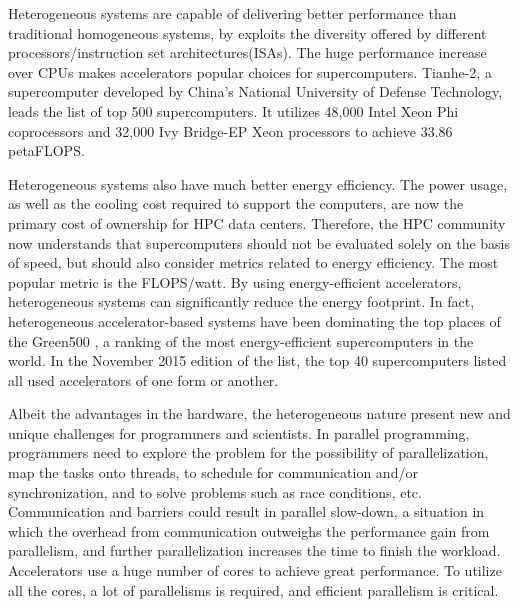 

Heterogeneous systems are capable of delivering better performance than 
traditional homogeneous systems, by exploits the diversity offered by different 
processors/instruction set architectures(ISAs). 
The huge performance increase over CPUs makes accelerators popular choices for
supercomputers. Tianhe-2\cite{Liao2014}, a supercomputer developed by China’s National 
University of Defense Technology, leads the list of top 500 supercomputers\cite{top500-2015-11}.
It utilizes 48,000  Intel Xeon Phi coprocessors and 32,000 Ivy Bridge-EP Xeon 
processors to achieve 33.86 petaFLOPS.

Heterogeneous systems also have much better energy efficiency. 
The power usage, as well as the cooling cost required to support the computers,
are now the primary cost of ownership for HPC data centers. Therefore,
the HPC community now understands that supercomputers should not be evaluated
solely on the basis of speed, but should also consider metrics related to 
energy efficiency. The most popular metric is the FLOPS/watt.
By using energy-efficient accelerators,
heterogeneous systems can significantly reduce the energy footprint. 
In fact, heterogeneous accelerator-based systems have been dominating the 
top places of the Green500 \cite{green500},
a ranking of the most energy-efficient supercomputers in the world. 
In the November 2015 edition of the list\cite{green500-2015-11}, 
the top 40 supercomputers listed all used accelerators of one form or another.

Albeit the advantages in the hardware, the heterogeneous nature present new
and unique challenges for programmers and scientists. 
In parallel programming, programmers need to explore the problem for the
possibility of parallelization, map the tasks onto threads, to schedule for
communication and/or synchronization, and to solve problems such as race conditions,
etc. Communication and barriers could result in parallel slow-down, 
a situation in which the overhead from communication outweighs the performance 
gain from parallelism, and further parallelization increases the time to finish
the workload. 
Accelerators use a huge number of cores to achieve great performance. 
To utilize all the cores, a lot of parallelisms is required, and efficient 
parallelism is critical. 

